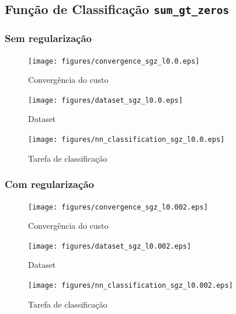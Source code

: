 \documentclass[a4paper,12pt]{article}
\begin{document}
\subsection{Função de Classificação \texttt{sum\_gt\_zeros}}

\subsubsection{Sem regularização}

\begin{figure}[!h]
    \centering
    \begin{minipage}[b]{0.45\linewidth}
        \centering
        \texttt{[image: figures/convergence\_sgz\_l0.0.eps]}
        \caption{Convergência do custo}
    \end{minipage}
    \hfill
    \begin{minipage}[b]{0.45\linewidth}
        \centering
        \texttt{[image: figures/dataset\_sgz\_l0.0.eps]}
        \caption{Dataset}
    \end{minipage}
    
    \vspace{0.5cm} %
    
    \texttt{[image: figures/nn\_classification\_sgz\_l0.0.eps]}
    \caption{Tarefa de classificação}
    
    \label{fig:three_figures}
\end{figure}

\subsubsection{Com regularização}

\begin{figure}[!h]
    \centering
    \begin{minipage}[b]{0.45\linewidth}
        \centering
        \texttt{[image: figures/convergence\_sgz\_l0.002.eps]}
        \caption{Convergência do custo}
    \end{minipage}
    \hfill
    \begin{minipage}[b]{0.45\linewidth}
        \centering
        \texttt{[image: figures/dataset\_sgz\_l0.002.eps]}
        \caption{Dataset}
    \end{minipage}
    
    \vspace{0.5cm} %
    
    \texttt{[image: figures/nn\_classification\_sgz\_l0.002.eps]}
    \caption{Tarefa de classificação}
    
    \label{fig:three_figures}
\end{figure}
\end{document}
